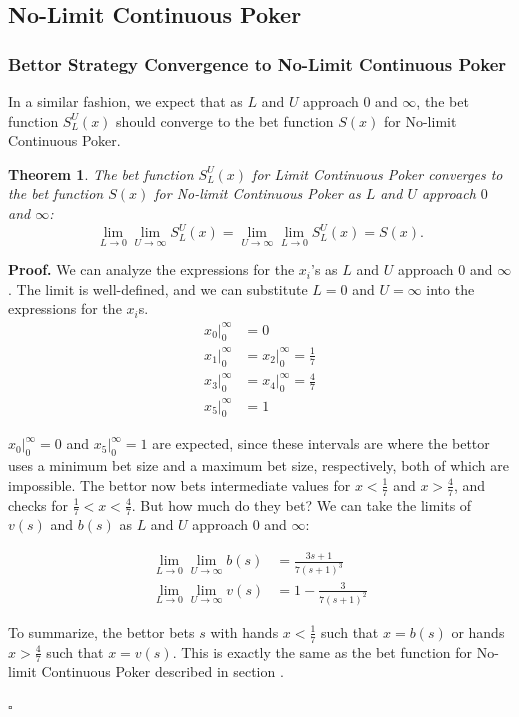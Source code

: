 \documentclass[a4paper,12pt]{article}
\theoremstyle{plain}
\newtheorem{theorem}{Theorem}[section]
\theoremstyle{definition}
\newenvironment{customproof}[1][Proof]{\noindent\textbf{#1.} }{\hfill$\square$\vspace{1em}}
\begin{document}
\subsection{No-Limit Continuous Poker}

\subsubsection{Bettor Strategy Convergence to No-Limit Continuous Poker}

In a similar fashion, we expect that as $L$ and $U$ approach $0$ and $\infty$, the bet function $S_L^U(x)$ should converge to the bet function $S(x)$ for No-limit Continuous Poker.

\begin{theorem}
    The bet function $S_L^U(x)$ for Limit Continuous Poker converges to the bet function $S(x)$ for No-limit Continuous Poker as $L$ and $U$ approach $0$ and $\infty$:
\[
\lim_{L \to 0} \lim_{U \to \infty} S_L^U(x) = \lim_{U \to \infty} \lim_{L \to 0} S_L^U(x) = S(x).
\]
\end{theorem}
\begin{customproof}
We can analyze the expressions for the $x_i$'s as $L$ and $U$ approach $0$ and $\infty$. The limit is well-defined, and we can substitute $L=0$ and $U=\infty$ into the expressions for the $x_i$s.
\begin{align*}
    x_0|_0^\infty &= 0 \\
    x_1|_0^\infty &= x_2|_0^\infty = \frac{1}{7} \\
    x_3|_0^\infty &= x_4|_0^\infty = \frac{4}{7} \\
    x_5|_0^\infty &= 1
\end{align*}

$x_0|_0^\infty = 0$ and $x_5|_0^\infty = 1$ are expected, since these intervals are where the bettor uses a minimum bet size and a maximum bet size, respectively, both of which are impossible. The bettor now bets intermediate values for $x < \frac{1}{7}$ and $x > \frac{4}{7}$, and checks for $\frac{1}{7} < x < \frac{4}{7}$. But how much do they bet? We can take the limits of $v(s)$ and $b(s)$ as $L$ and $U$ approach $0$ and $\infty$:

\begin{align*}
    \lim_{L \to 0} \lim_{U \to \infty} b(s) &= \frac{3 s+1}{7 (s+1)^3}\\
    \lim_{L \to 0} \lim_{U \to \infty} v(s) &= 1 - \frac{3}{7 (s+1)^2}
\end{align*}

To summarize, the bettor bets $s$ with hands $x < \frac{1}{7}$ such that $x = b(s)$ or hands $x > \frac{4}{7}$ such that $x = v(s)$. This is exactly the same as the bet function for No-limit Continuous Poker described in section .

\end{customproof}
\end{document}
